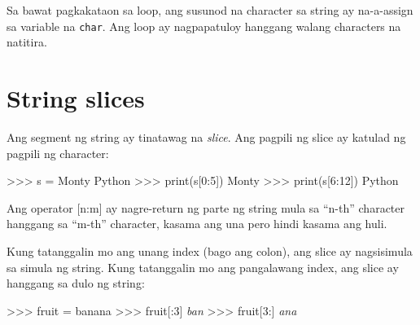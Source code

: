 \documentclass[10pt,]{book}
\newenvironment{Shaded}{}{}
\newcommand{\BuiltInTok}[1]{\textcolor[rgb]{0.00,0.50,0.00}{#1}}
\newcommand{\CommentTok}[1]{\textcolor[rgb]{0.38,0.63,0.69}{\textit{#1}}}
\newcommand{\DecValTok}[1]{\textcolor[rgb]{0.25,0.63,0.44}{#1}}
\newcommand{\NormalTok}[1]{#1}
\newcommand{\OperatorTok}[1]{\textcolor[rgb]{0.40,0.40,0.40}{#1}}
\newcommand{\StringTok}[1]{\textcolor[rgb]{0.25,0.44,0.63}{#1}}
\begin{document}
Sa bawat pagkakataon sa loop, ang susunod na character sa string ay
na-a-assign sa variable na \texttt{char}. Ang loop ay nagpapatuloy
hanggang walang characters na natitira.

\section{String slices}\label{string-slices}

  
 

Ang segment ng string ay tinatawag na \emph{slice}. Ang pagpili ng slice
ay katulad ng pagpili ng character:

\begin{Shaded}
\begin{Highlighting}[]
\OperatorTok{\textgreater{}\textgreater{}\textgreater{}}\NormalTok{ s }\OperatorTok{=} \StringTok{\textquotesingle{}Monty Python\textquotesingle{}}
\OperatorTok{\textgreater{}\textgreater{}\textgreater{}} \BuiltInTok{print}\NormalTok{(s[}\DecValTok{0}\NormalTok{:}\DecValTok{5}\NormalTok{])}
\NormalTok{Monty}
\OperatorTok{\textgreater{}\textgreater{}\textgreater{}} \BuiltInTok{print}\NormalTok{(s[}\DecValTok{6}\NormalTok{:}\DecValTok{12}\NormalTok{])}
\NormalTok{Python}
\end{Highlighting}
\end{Shaded}

Ang operator {[}n:m{]} ay nagre-return ng parte ng string mula sa
``n-th'' character hanggang sa ``m-th'' character, kasama ang una pero
hindi kasama ang huli.

Kung tatanggalin mo ang unang index (bago ang colon), ang slice ay
nagsisimula sa simula ng string. Kung tatanggalin mo ang pangalawang
index, ang slice ay hanggang sa dulo ng string:

\begin{Shaded}
\begin{Highlighting}[]
\OperatorTok{\textgreater{}\textgreater{}\textgreater{}}\NormalTok{ fruit }\OperatorTok{=} \StringTok{\textquotesingle{}banana\textquotesingle{}}
\OperatorTok{\textgreater{}\textgreater{}\textgreater{}}\NormalTok{ fruit[:}\DecValTok{3}\NormalTok{]}
\CommentTok{\textquotesingle{}ban\textquotesingle{}}
\OperatorTok{\textgreater{}\textgreater{}\textgreater{}}\NormalTok{ fruit[}\DecValTok{3}\NormalTok{:]}
\CommentTok{\textquotesingle{}ana\textquotesingle{}}
\end{Highlighting}
\end{Shaded}
\end{document}
